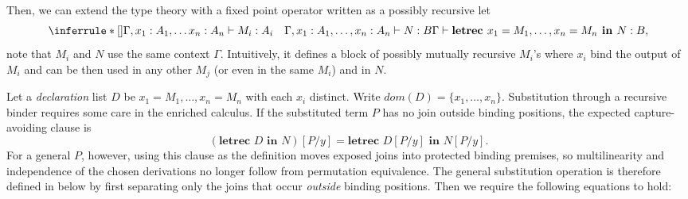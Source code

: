Then, we can extend the type theory with a fixed point operator written as a possibly recursive let
\[
\inferrule*[]{\Gamma, x_1 : A_1, \ldots x_n : A_n \vdash M_i : A_i \quad \Gamma, x_1 : A_1, \ldots, x_n : A_n \vdash N : B}
{\Gamma \vdash \textbf{letrec } x_1 = M_1, \ldots, x_n = M_n \textbf{ in } N : B},
\]
note that $M_i$ and $N$ use the same context $\Gamma$.
Intuitively, it defines a block of possibly mutually recursive $M_i$'s where $x_i$ bind the output of $M_i$ and can be then used in any other $M_j$ (or even in the same $M_i$) and in $N$.


Let a \emph{declaration} list $D$ be $x_1 = M_1, \ldots, x_n = M_n$ with each $x_i$ distinct.
Write $dom(D) = \{x_1, \ldots, x_n \}$.
Substitution through a recursive binder requires some care in the enriched
calculus.  If the substituted term $P$ has no join outside binding positions,
the expected capture-avoiding clause is
\[
(\textbf{letrec } D \textbf{ in } N) [P/y]
  = \textbf{letrec } D[P/y] \textbf{ in } N[P/y].
\]
For a general $P$, however, using this clause as the definition moves exposed
joins into protected binding premises, so multilinearity and independence of
the chosen derivations no longer follow from permutation equivalence.  The
general substitution operation is therefore defined in
 below by first separating only the joins that
occur \emph{outside} binding positions.
Then we require the following equations to hold:
